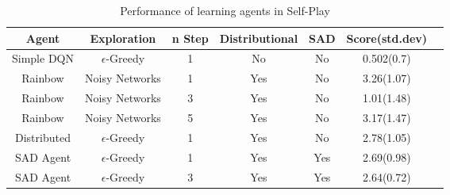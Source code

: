 
\begin{table}
  \caption{Performance of learning agents in Self-Play}
  \label{tab:sp_performance}
  \begin{tabular}{|c|c|c|c|c|c|c|}
    \toprule
    \textbf{Agent} & \textbf{Exploration} & \textbf{n Step} & \textbf{Distributional} & \textbf{SAD} & \textbf{Score(std.dev)} \\
    \midrule
    Simple DQN & $\epsilon$-Greedy & 1 & No & No & 0.502(0.7) \\
    Rainbow & Noisy Networks & 1 & Yes & No & 3.26(1.07) \\
    Rainbow & Noisy Networks & 3 & Yes & No & 1.01(1.48) \\
    Rainbow & Noisy Networks & 5 & Yes & No & 3.17(1.47) \\
    Distributed & $\epsilon$-Greedy & 1 & Yes & No & 2.78(1.05) \\
    SAD Agent & $\epsilon$-Greedy & 1 & Yes & Yes & 2.69(0.98) \\
    SAD Agent & $\epsilon$-Greedy & 3 & Yes & Yes & 2.64(0.72) \\   
  \bottomrule
\end{tabular}
\end{table}

